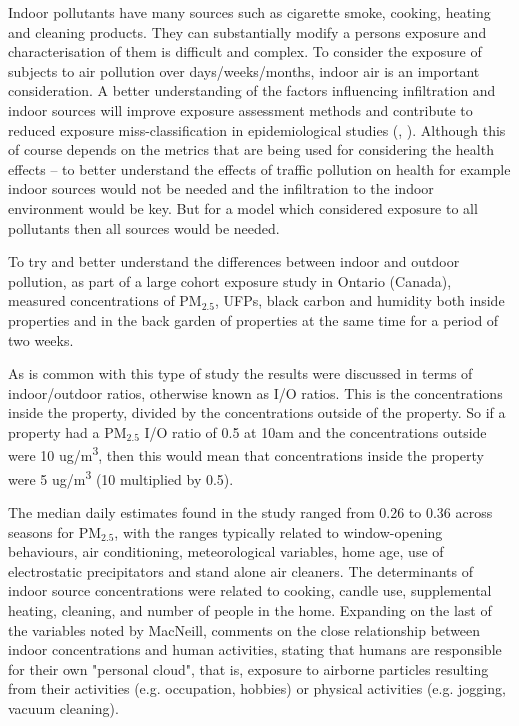 Indoor pollutants have many sources such as cigarette smoke, cooking, heating and cleaning products. They can substantially modify a persons exposure and characterisation of them is difficult and complex. To consider the exposure of subjects to air pollution over days/weeks/months, indoor air is an important consideration.  A better understanding of the factors influencing infiltration and indoor sources will improve exposure assessment methods and contribute to reduced exposure miss-classification in epidemiological studies (\cite{Colbeck2010a}, \cite{MacNeill2012}). Although this of course depends on the metrics that are being used for considering the health effects -- to better understand the effects of traffic pollution on health for example indoor sources would not be needed and the infiltration to the indoor environment would be key. But for a model which considered exposure to all pollutants then all sources would be needed.

To try and better understand the differences between indoor and outdoor pollution, as part of a large cohort exposure study in Ontario (Canada), \cite{MacNeill2012} measured concentrations of PM$_{2.5}$, UFPs, black carbon and humidity both inside properties and in the back garden of properties at the same time for a period of two weeks.

As is common with this type of study the results were discussed in terms of indoor\slash outdoor ratios, otherwise known as I\slash O ratios. This is the concentrations inside the property, divided by the concentrations outside of the property. So if a property had a PM$_{2.5}$ I\slash O ratio of 0.5 at 10am and the concentrations outside were 10 ug\slash m\textsuperscript{3}, then this would mean that concentrations inside the property were 5 ug\slash m\textsuperscript{3} (10 multiplied by 0.5).

The median daily estimates found in the study ranged from 0.26 to 0.36 across seasons for PM$_{2.5}$, with the ranges typically related to window-opening behaviours, air conditioning, meteorological variables, home age, use of electrostatic precipitators and stand alone air cleaners. The determinants of indoor source concentrations were related to cooking, candle use, supplemental heating, cleaning, and number of people in the home. Expanding on the last of the variables noted by MacNeill, \cite{Colbeck2010a} comments on the close relationship between indoor concentrations and human activities, stating that humans are responsible for their own "personal cloud", that is, exposure to airborne particles resulting from their activities (e.g. occupation, hobbies) or physical activities (e.g. jogging, vacuum cleaning).

